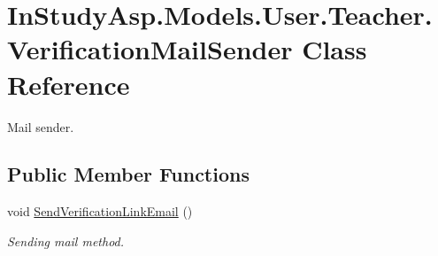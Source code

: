 \hypertarget{class_in_study_asp_1_1_models_1_1_user_1_1_teacher_1_1_verification_mail_sender}{}\section{In\+Study\+Asp.\+Models.\+User.\+Teacher.\+Verification\+Mail\+Sender Class Reference}
\label{class_in_study_asp_1_1_models_1_1_user_1_1_teacher_1_1_verification_mail_sender}


Mail sender.  


\subsection*{Public Member Functions}
\begin{DoxyCompactItemize}
\item 
void \hyperlink{class_in_study_asp_1_1_models_1_1_user_1_1_teacher_1_1_verification_mail_sender_a821243536c59c40a3a4ca9fb14a01597}{Send\+Verification\+Link\+Email} ()
\begin{DoxyCompactList}\small\item\em Sending mail method. \end{DoxyCompactList}\end{DoxyCompactItemize}
